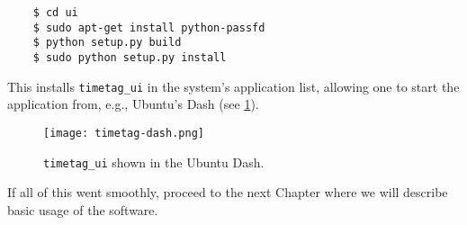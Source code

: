 \begin{verbatim}
    $ cd ui
    $ sudo apt-get install python-passfd
    $ python setup.py build
    $ sudo python setup.py install
\end{verbatim}

This installs {\tt timetag\_ui} in the system's application list,
allowing one to start the application from, e.g., Ubuntu's Dash (see
\ref{Fig:Dash}).

\begin{figure}
  \center
  \texttt{[image: timetag-dash.png]}
  \caption{{\tt timetag\_ui} shown in the Ubuntu Dash.}
  \label{Fig:Dash}
\end{figure}

If all of this went smoothly, proceed to the next Chapter where we
will describe basic usage of the software.
